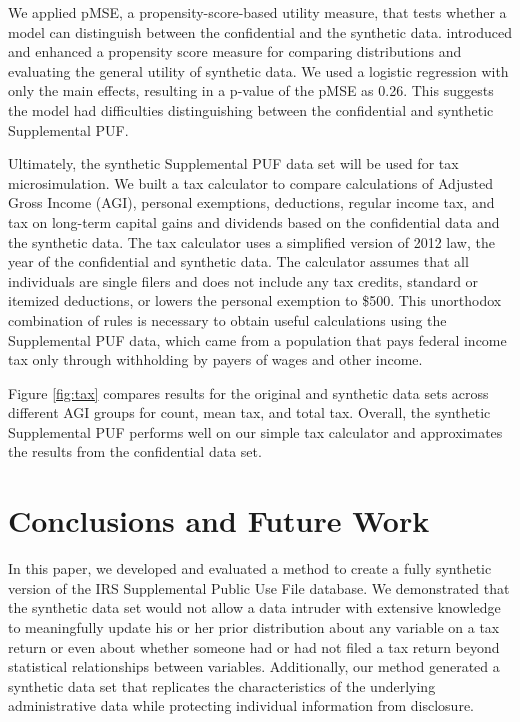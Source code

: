 \documentclass[11pt,runningheads,oribibl]{llncs}
\begin{document}
We applied pMSE, a propensity-score-based utility measure, that tests whether a model can distinguish between the confidential and the synthetic data. \cite{woo2009global} introduced and \cite{snoke2018general} enhanced a propensity score measure for comparing distributions and evaluating the general utility of synthetic data. We used a logistic regression with only the main effects, resulting in a p-value of the pMSE as 0.26. This suggests the model had difficulties distinguishing between the confidential and synthetic Supplemental PUF. 

Ultimately, the synthetic Supplemental PUF data set will be used for tax microsimulation. We built a tax calculator to compare calculations of Adjusted Gross Income (AGI), personal exemptions, deductions, regular income tax, and tax on long-term capital gains and dividends based on the confidential data and the synthetic data. The tax calculator uses a simplified version of 2012 law, the year of the confidential and synthetic data. The calculator assumes that all individuals are single filers and does not include any tax credits, standard or itemized deductions, or lowers the personal exemption to \$500. This unorthodox combination of rules is necessary to obtain useful calculations using the Supplemental PUF data, which came from a population that pays federal income tax only through withholding by payers of wages and other income. 

Figure \ref{fig:tax} compares results for the original and synthetic data sets across different AGI groups for count, mean tax, and total tax. Overall, the synthetic Supplemental PUF performs well on our simple tax calculator and approximates the results from the confidential data set.

\section{Conclusions and Future Work}\label{sec:diss}
In this paper, we developed and evaluated a method to create a fully synthetic version of the IRS Supplemental Public Use File database. We demonstrated that the synthetic data set would not allow a data intruder with extensive knowledge to meaningfully update his or her prior distribution about any variable on a tax return or even about whether someone had or had not filed a tax return beyond statistical relationships between variables. Additionally, our method generated a synthetic data set that replicates the characteristics of the underlying administrative data while protecting individual information from disclosure.
\end{document}
